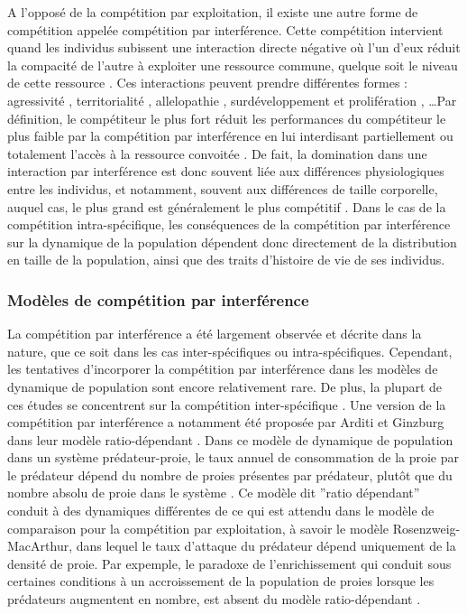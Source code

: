 A l'opposé de la compétition par exploitation, il existe une autre forme de
compétition appelée compétition par interférence. Cette compétition intervient
quand les individus subissent une interaction directe négative où l'un d'eux
réduit la compacité de l'autre à exploiter une ressource commune, quelque soit
le niveau de cette ressource \autocite{park1954a,vance1984a}. Ces interactions
peuvent prendre différentes formes : agressivité \autocite{schoener1976a},
territorialité \autocite{walls1990a,kennedy1996a}, allelopathie
\autocite{harper1977a,rice1984a,nilsson1994a}, surdéveloppement et prolifération
\autocite{connell1961a,paine1966a}, \ldots Par définition, le compétiteur le
plus fort réduit les performances du compétiteur
le plus faible par la compétition par interférence en lui interdisant
partiellement ou totalement l'accès à la ressource convoitée
\autocite{schoener1983a, thompson1993a}. De fait, la domination dans une
interaction par interférence est donc souvent liée aux différences
physiologiques entre les individus, et notamment, souvent aux différences de
taille corporelle, auquel cas, le plus grand est généralement le plus
compétitif \autocite{mccormick2012a}. Dans le cas de la compétition
intra-spécifique, les conséquences de la compétition par interférence sur la
dynamique de la population dépendent donc directement de la distribution en
taille de la population, ainsi que des traits d'histoire de vie de ses
individus. 

\subsubsection{Modèles de compétition par interférence}

La compétition par interférence a été largement observée et décrite dans la
nature, que ce soit dans les cas inter-spécifiques ou intra-spécifiques.
Cependant, les tentatives d'incorporer la compétition par interférence dans les
modèles de dynamique de population sont encore relativement rare. De plus, la
plupart de ces études se concentrent sur la compétition inter-spécifique
\autocite{case1974a, carothers1984a, vance1984a, adler2000a}. Une version de la
compétition par interférence a notamment été proposée par Arditi et Ginzburg
dans leur modèle ratio-dépendant \autocite{arditi1989a,arditi2012a,arditi1991a}.
Dans ce modèle de dynamique de population dans un système prédateur-proie, le
taux annuel de consommation de la proie par le prédateur dépend du nombre de
proies présentes par prédateur, plutôt que du nombre absolu de proie dans le
système \autocite[voir][pour les détails et dérivations du modèle]{arditi2012a}.
Ce modèle dit ''ratio dépendant'' conduit à des dynamiques différentes de ce qui
est attendu dans le modèle de comparaison pour la compétition par exploitation,
à savoir le modèle Rosenzweig-MacArthur, dans lequel le taux d'attaque du
prédateur dépend uniquement de la densité de proie. Par expemple, le paradoxe de
l'enrichissement qui conduit sous certaines conditions à un accroissement de la
population de proies lorsque les prédateurs augmentent en nombre, est absent du
modèle ratio-dépendant \autocite{arditi2012a}. 

